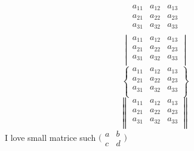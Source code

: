 \documentclass[a4paper,12pt]{article}
\begin{document}
\begin{equation*}
   \begin{matrix} 
   a_{11} & a_{12} & a_{13}  \\
   a_{21} & a_{22} & a_{23}  \\
   a_{31} & a_{32} & a_{33}  \\
   \end{matrix} 
\end{equation*}
\begin{equation*}
   \begin{vmatrix} 
   a_{11} & a_{12} & a_{13}  \\
   a_{21} & a_{22} & a_{23}  \\
   a_{31} & a_{32} & a_{33}  \\
   \end{vmatrix} 
\end{equation*}
\begin{equation*}
   \begin{Bmatrix} 
   a_{11} & a_{12} & a_{13}  \\
   a_{21} & a_{22} & a_{23}  \\
   a_{31} & a_{32} & a_{33}  \\
   \end{Bmatrix} 
\end{equation*}
\begin{equation*}
   \begin{Vmatrix} 
   a_{11} & a_{12} & a_{13}  \\
   a_{21} & a_{22} & a_{23}  \\
   a_{31} & a_{32} & a_{33}  \\
   \end{Vmatrix} 
\end{equation*}
I love small matrice such $\big(\begin{smallmatrix} a & b\\ c & d \end{smallmatrix}\big)$
\end{document}
